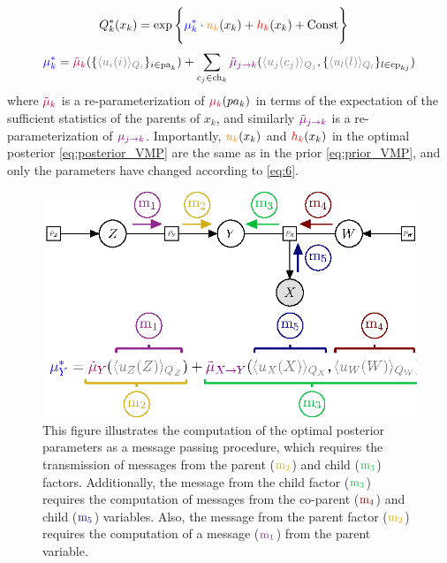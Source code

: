 \documentclass[twoside,11pt]{article}
\begin{document}
\begin{align}\label{eq:posterior_VMP}
Q_k^*(x_k) &= \exp \Bigg\{ {\color{blue}\mu_k^*} \cdot {\color{orange}u_k}(x_k) + {\color{red}h_k}(x_k) + \text{Const} \Bigg\}
\end{align}
\begin{align}\label{eq:6}
{\color{blue}\mu_k^*} = {\color{purple}\tilde{\mu}_{k}}(\{{\color{gray}\langle u_{i}(i) \rangle_{Q_{i}}} \}_{i \in \text{pa}_k} ) + \sum_{c_j \in \text{ch}_k} {\color{violet}\tilde{\mu}_{j \rightarrow k}}({\color{gray}\langle u_j(c_j) \rangle_{Q_j}}, \{{\color{gray}\langle u_{l}(l)\rangle_{Q_l}} \}_{l \in \text{cp}_{kj}} )
\end{align}
where ${\color{purple}\tilde{\mu}_{k}}$ is a re-parameterization of ${\color{purple}\mu_k}(pa_k)$ in terms of the expectation of the sufficient statistics of the parents of $x_k$, and similarly ${\color{violet}\tilde{\mu}_{j \rightarrow k}}$ is a re-parameterization of ${\color{violet}\mu_{j \rightarrow k}}$. Importantly, ${\color{orange}u_k}(x_k)$ and ${\color{red}h_k}(x_k)$ in the optimal posterior \eqref{eq:posterior_VMP} are the same as in the prior \eqref{eq:prior_VMP}, and only the parameters have changed according to \eqref{eq:6}.

\begin{figure}[H]
	\begin{center}
	\includegraphics[scale=1]{BTAI-figure1}
	\end{center}
  \caption{This figure illustrates the computation of the optimal posterior parameters as a message passing procedure, which requires the transmission of messages from the parent (${\color{Yellow}\text{m}_2}$) and child (${\color{Green}\text{m}_3}$) factors. Additionally, the message from the child factor (${\color{Green}\text{m}_3}$) requires the computation of messages from the co-parent (${\color{Red}\text{m}_4}$) and child (${\color{Blue}\text{m}_5}$) variables. Also, the message from the parent factor (${\color{Yellow}\text{m}_2}$) requires the computation of a message (${\color{Violet}\text{m}_1}$) from the parent variable.}
   \label{fig:messages-ffg}
\end{figure}
\end{document}
